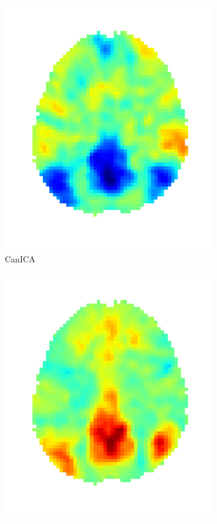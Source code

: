 \documentclass{article} %
\begin{document}
\begin{figure}
\begin{preview}
\begin{subfigure}[b]{.3\linewidth}
        \includegraphics[width=\linewidth]{canica}%
	\vspace*{-1.8em}
        \caption{\sffamily CanICA}
      \end{subfigure}
      \begin{subfigure}[b]{.3\linewidth}
        \includegraphics[width=\linewidth]{melodic}%

\end{subfigure}
\end{preview}
\end{figure}
\end{document}
